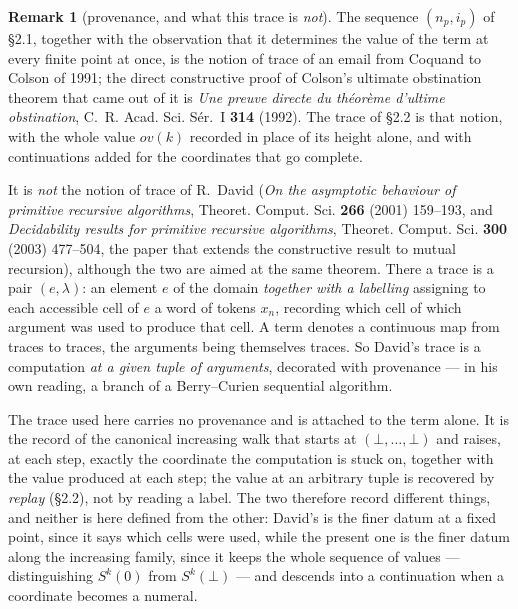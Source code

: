 \documentclass[11pt]{article}
\newcommand{\ovv}{\mathit{ov}}
\theoremstyle{definition}
\newtheorem{remark}{Remark}
\begin{document}
\begin{remark}[provenance, and what this trace is \emph{not}]
\label{rem:prov}
The sequence $(n_p,i_p)$ of \S2.1, together with the observation that it
determines the value of the term at every finite point at once, is the
notion of trace of an email from Coquand to Colson of 1991; the direct
constructive proof of Colson's ultimate obstination theorem that came out
of it is \emph{Une preuve directe du th\'eor\`eme d'ultime obstination},
C.~R. Acad. Sci. S\'er.~I \textbf{314} (1992). The trace of \S2.2 is that
notion, with the whole value $\ovv(k)$ recorded in place of its height
alone, and with continuations added for the coordinates that go complete.

It is \emph{not} the notion of trace of R.~David (\emph{On the asymptotic
behaviour of primitive recursive algorithms}, Theoret. Comput. Sci.
\textbf{266} (2001) 159--193, and \emph{Decidability results for primitive
recursive algorithms}, Theoret. Comput. Sci. \textbf{300} (2003) 477--504, the paper that extends the constructive
result to mutual recursion), although the two are aimed at the same
theorem. There a trace is
a pair $(e,\lambda)$: an element $e$ of the domain \emph{together with a
labelling} assigning to each accessible cell of $e$ a word of tokens $x_n$,
recording which cell of which argument was used to produce that cell. A
term denotes a continuous map from traces to traces, the arguments being
themselves traces. So David's trace is a computation \emph{at a given
tuple of arguments}, decorated with provenance --- in his own reading, a
branch of a Berry--Curien sequential algorithm.

The trace used here carries no provenance and is attached to the term
alone. It is the record of the canonical increasing walk that starts at
$(\bot,\dots,\bot)$ and raises, at each step, exactly the coordinate the
computation is stuck on, together with the value produced at each step; the
value at an arbitrary tuple is recovered by \emph{replay} (\S2.2), not by
reading a label. The two therefore record different things, and neither is
here defined from the other: David's is the finer datum at a fixed point,
since it says which cells were used, while the present one is the finer
datum along the increasing family, since it keeps the whole sequence of
values --- distinguishing $S^k(0)$ from $S^k(\bot)$ --- and descends into a
continuation when a coordinate becomes a numeral.


\end{remark}
\end{document}
